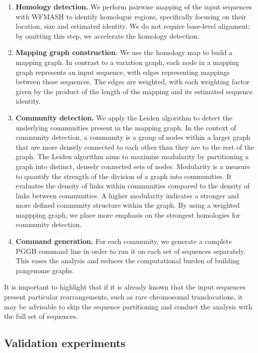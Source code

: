 \documentclass[pdflatex,mathphys]{jnl}%
\theoremstyle{thmstyleone}%
\theoremstyle{thmstyletwo}%
\theoremstyle{thmstylethree}%
\begin{document}
\begin{appendices}
\begin{enumerate}
    \item 
    \textbf{Homology detection.} We perform pairwise mapping of the input sequences with WFMASH \cite{Guarracino_wfmash_2021} to identify homologus regions, specifically focusing on their location, size and estimated identity. We do not require base-level alignment; by omitting this step, we accelerate the homology detection.
    \item
    \textbf{Mapping graph construction.}
    We use the homology map to build a mapping graph. In contrast to a variation graph, each node in a mapping graph represents an input sequence, with edges representing mappings between these sequences. The edges are weighted, with each weighting factor given by the product of the length of the mapping and its estimated sequence identity.
    \item
    \textbf{Community detection.} We apply the Leiden algorithm \cite{Traag2019} to detect the underlying communities present in the mapping graph. In the context of community detection, a community is a group of nodes within a larger graph that are more densely connected to each other than they are to the rest of the graph. The Leiden algorithm aims to maximize modularity by partitioning a graph into distinct, densely connected sets of nodes. Modularity is a measure to quantify the strength of the division of a graph into communities. It evaluates the density of links within communities compared to the density of links between communities. A higher modularity indicates a stronger and more defined community structure within the graph. By using a weighted mappping graph, we place more emphasis on the strongest homologies for community detection.
    \item
    \textbf{Command generation.} For each community, we generate a complete PGGB command line in order to run it on each set of sequences separately. This eases the analysis and reduces the computational burden of building pangenome graphs.
\end{enumerate}

It is important to highlight that if it is already known that the input sequences present particular rearrangements, such as rare chromosomal translocations, it may be advisable to skip the sequence partitioning and conduct the analysis with the full set of sequences.

\subsection{Validation experiments}


\end{appendices}
\end{document}

